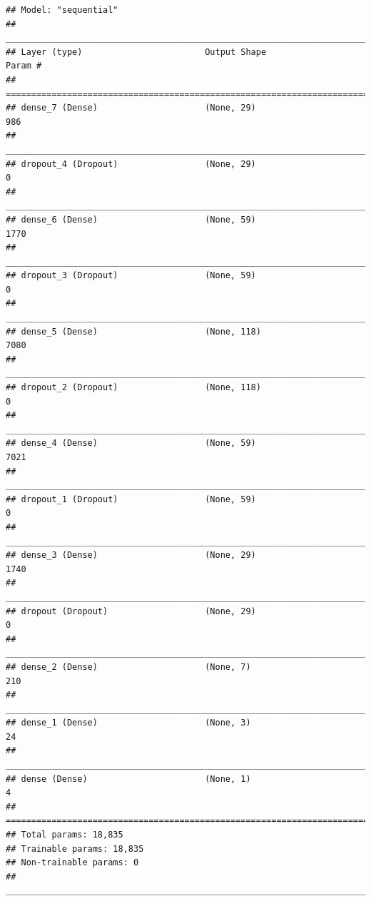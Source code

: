 \documentclass[
]{article}
\begin{document}
\begin{verbatim}
## Model: "sequential"
## ________________________________________________________________________________
## Layer (type)                        Output Shape                    Param #     
## ================================================================================
## dense_7 (Dense)                     (None, 29)                      986         
## ________________________________________________________________________________
## dropout_4 (Dropout)                 (None, 29)                      0           
## ________________________________________________________________________________
## dense_6 (Dense)                     (None, 59)                      1770        
## ________________________________________________________________________________
## dropout_3 (Dropout)                 (None, 59)                      0           
## ________________________________________________________________________________
## dense_5 (Dense)                     (None, 118)                     7080        
## ________________________________________________________________________________
## dropout_2 (Dropout)                 (None, 118)                     0           
## ________________________________________________________________________________
## dense_4 (Dense)                     (None, 59)                      7021        
## ________________________________________________________________________________
## dropout_1 (Dropout)                 (None, 59)                      0           
## ________________________________________________________________________________
## dense_3 (Dense)                     (None, 29)                      1740        
## ________________________________________________________________________________
## dropout (Dropout)                   (None, 29)                      0           
## ________________________________________________________________________________
## dense_2 (Dense)                     (None, 7)                       210         
## ________________________________________________________________________________
## dense_1 (Dense)                     (None, 3)                       24          
## ________________________________________________________________________________
## dense (Dense)                       (None, 1)                       4           
## ================================================================================
## Total params: 18,835
## Trainable params: 18,835
## Non-trainable params: 0
## ________________________________________________________________________________
\end{verbatim}
\end{document}

